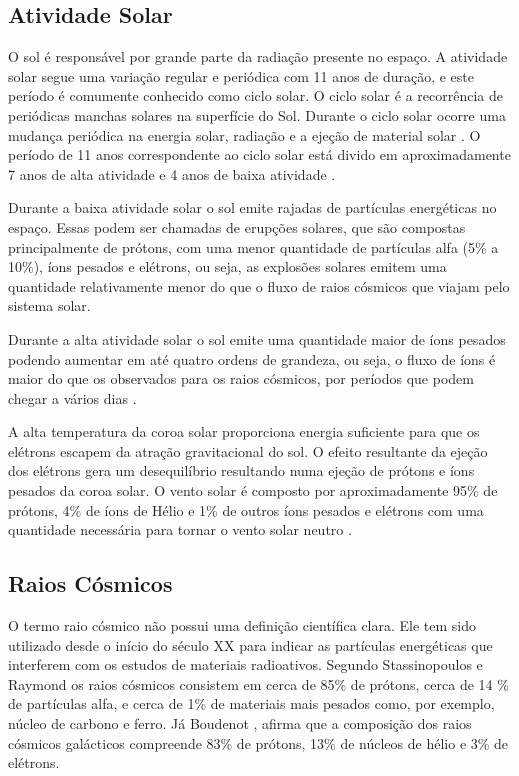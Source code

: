 \subsection{Atividade Solar}

O sol é responsável por grande parte da radiação presente no espaço. A atividade solar segue uma variação regular e periódica com 11 anos de duração, e este período é comumente conhecido como ciclo solar. O ciclo solar é a recorrência de periódicas manchas solares na superfície do Sol. Durante o ciclo solar ocorre uma mudança periódica na energia solar, radiação e a ejeção de material solar \cite{Mansoori:2013}. O período de 11 anos correspondente ao ciclo solar está divido em aproximadamente 7 anos de alta atividade e 4 anos de baixa atividade \cite{Boudenot:2007}. 

Durante a baixa atividade solar o sol emite rajadas de partículas energéticas no espaço. Essas podem ser chamadas de erupções solares, que são compostas principalmente de prótons, com uma menor quantidade de partículas alfa (5\% a 10\%), íons pesados e elétrons, ou seja, as explosões solares emitem uma quantidade relativamente menor do que o fluxo de raios cósmicos que viajam pelo sistema solar.

Durante a alta atividade solar o sol emite uma quantidade maior de íons pesados podendo aumentar em até quatro ordens de grandeza, ou seja, o fluxo de íons é maior do que os observados para os raios cósmicos, por períodos que podem chegar a vários dias \cite{Stassinopoulos:1988}. 

A alta temperatura da coroa solar proporciona energia suficiente para que os elétrons escapem da atração gravitacional do sol. O efeito resultante da ejeção dos elétrons gera um desequilíbrio resultando numa ejeção de prótons e íons pesados da coroa solar. O vento solar é composto por aproximadamente 95\% de prótons, 4\% de íons de Hélio e 1\% de outros íons pesados e elétrons com uma quantidade necessária para tornar o vento solar neutro \cite{Velazco:2007}. 



\subsection{Raios Cósmicos} \label{subsec:raiosCosmicos}

O termo raio cósmico não possui uma definição científica clara. Ele tem sido utilizado desde o início do século XX para indicar as partículas energéticas que interferem com os estudos de materiais radioativos. Segundo Stassinopoulos e Raymond \cite{Stassinopoulos:1988} os raios cósmicos consistem em cerca de 85\% de prótons, cerca de 14 \% de partículas alfa, e cerca de 1\% de materiais mais pesados como, por exemplo, núcleo de carbono e ferro. Já Boudenot \cite{Boudenot:2007}, afirma que a composição dos raios cósmicos galácticos compreende 83\% de prótons, 13\% de núcleos de hélio e 3\% de elétrons. 

